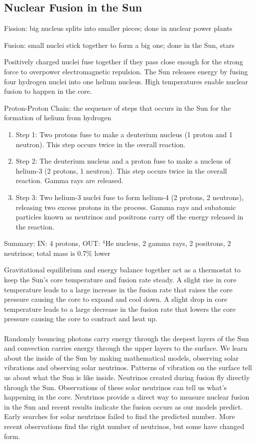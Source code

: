 \documentclass[12pt]{article}
\begin{document}
\subsection{Nuclear Fusion in the Sun}
\begin{definition} Fission: big nucleus splits into smaller pieces; done in nuclear power plants \end{definition} 
\begin{definition} Fusion: small nuclei stick together to form a big one; done in the Sun, stars \end{definition}
Positively charged nuclei fuse together if they pass close enough for the strong force to overpower electromagnetic repulsion. The Sun releases energy by fusing four hydrogen nuclei into one helium nucleus. High temperatures enable nuclear fusion to happen in the core. 
\begin{definition} Proton-Proton Chain: the sequence of steps that occurs in the Sun for the formation of helium from hydrogen \begin{enumerate} 
\item Step 1: Two protons fuse to make a deuterium nucleus (1 proton and 1 neutron). This step occurs twice in the overall reaction. 
\item Step 2: The deuterium nucleus and a proton fuse to make a nucleus of helium-3 (2 protons, 1 neutron). This step occurs twice in the overall reaction. Gamma rays are released. 
\item Step 3: Two helium-3 nuclei fuse to form helium-4 (2 protons, 2 neutrons), releasing two excess protons in the process. Gamma rays and subatomic particles known as neutrinos and positrons carry off the energy released in the reaction. \end{enumerate} 
Summary: IN: 4 protons, OUT: $^4$He nucleus, 2 gamma rays, 2 positrons, 2 neutrinos; total mass is 0.7\% lower \end{definition}
Gravitational equilibrium and energy balance together act as a thermostat to keep the Sun's core temperature and fusion rate steady. A slight rise in core temperature leads to a large increase in the fusion rate that raises the core pressure causing the core to expand and cool down. A slight drop in core temperature leads to a large decrease in the fusion rate that lowers the core pressure causing the core to contract and heat up. \\~\\
Randomly bouncing photons carry energy through the deepest layers of the Sun and convection carries energy through the upper layers to the surface. We learn about the inside of the Sun by making mathematical models, observing solar vibrations and observing solar neutrinos. Patterns of vibration on the surface tell us about what the Sun is like inside. Neutrinos created during fusion fly directly through the Sun. Observations of these solar neutrinos can tell us what's happening in the core. Neutrinos provide a direct way to measure nuclear fusion in the Sun and recent results indicate the fusion occurs as our models predict. Early searches for solar neutrinos failed to find the predicted number. More recent observations find the right number of neutrinos, but some have changed form.
\end{document}

